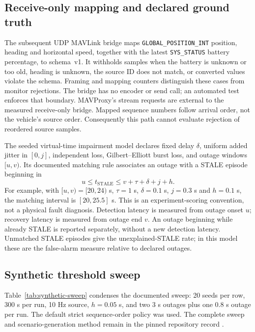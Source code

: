 \documentclass[11pt,a4paper]{article}
\newcommand{\code}[1]{\texttt{#1}}
\begin{document}
\subsection{Receive-only mapping and declared ground truth}
The subsequent UDP MAVLink bridge maps \code{GLOBAL\_POSITION\_INT} position,
heading and horizontal speed, together with the latest
\code{SYS\_STATUS} battery percentage, to schema~v1. It withholds samples
when the battery is unknown or too old, heading is unknown, the source ID
does not match, or converted values violate the schema. Framing and mapping
counters distinguish these cases from monitor rejections. The bridge has
no encoder or send call; an automated test enforces that boundary. MAVProxy's
stream requests are external to the measured receive-only bridge.
Mapped sequence numbers follow arrival order, not the vehicle's source order.
Consequently this path cannot evaluate rejection of reordered source samples.

The seeded virtual-time impairment model declares fixed delay $\delta$,
uniform added jitter in $[0,j]$, independent loss, Gilbert--Elliott burst loss,
and outage windows $[u,v)$. Its documented matching rule associates an outage
with a STALE episode beginning in
\begin{equation}
u\leq t_{\mathrm{STALE}}\leq v+\tau+\delta+j+h.
\label{eq:outage-match}
\end{equation}
For example, with $[u,v)=[20,24)$ s, $\tau=1$ s, $\delta=0.1$ s,
$j=0.3$ s and $h=0.1$ s, the matching interval is $[20,25.5]$ s.
This is an experiment-scoring convention, not a physical fault diagnosis.
Detection latency is measured from outage onset $u$; recovery latency is
measured from outage end $v$. An outage beginning while already STALE is
reported separately, without a new detection latency. Unmatched STALE
episodes give the unexplained-STALE rate; in this model these are the
false-alarm measure relative to declared outages.

\subsection{Synthetic threshold sweep}
Table~\ref{tab:synthetic-sweep} condenses the documented sweep: 20 seeds per
row, 300 s per run, 10 Hz source, $h=0.05$ s, and two 3 s outages plus one
0.8 s outage per run. The default strict sequence-order policy was used.
The complete sweep and scenario-generation method remain in the pinned
repository record \cite{simulation_record}.
\end{document}
